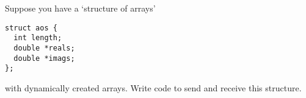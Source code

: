   \label{ex:packAOS}
  Suppose you have a `structure of arrays'
\begin{lstlisting}
struct aos {
  int length;
  double *reals;
  double *imags;
};
\end{lstlisting}
  with dynamically created arrays. Write code to send and receive this
  structure.
